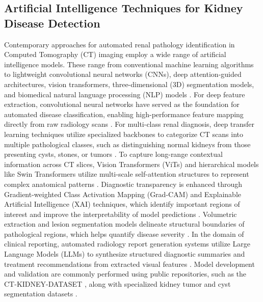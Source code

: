 \documentclass[]{elsarticle}
\begin{document}
\subsection{Artificial Intelligence Techniques for Kidney Disease Detection}
Contemporary approaches for automated renal pathology identification in Computed Tomography (CT) imaging employ a wide range of artificial intelligence models. These range from conventional machine learning algorithms to lightweight convolutional neural networks (CNNs), deep attention-guided architectures, vision transformers, three-dimensional (3D) segmentation models, and biomedical natural language processing (NLP) models \cite{aburass2025vision, liu2021swin, dosovitskiy2020image, lecun2015deep, litjens2017survey}. For deep feature extraction, convolutional neural networks have served as the foundation for automated disease classification, enabling high-performance feature mapping directly from raw radiology scans \cite{kermany2018identifying, lecun2015deep}. For multi-class renal diagnosis, deep transfer learning techniques utilize specialized backbones to categorize CT scans into multiple pathological classes, such as distinguishing normal kidneys from those presenting cysts, stones, or tumors \cite{kumar2024comprehensive, hossain2025detection}. To capture long-range contextual information across CT slices, Vision Transformers (ViTs) and hierarchical models like Swin Transformers utilize multi-scale self-attention structures to represent complex anatomical patterns \cite{aburass2025vision, liu2021swin, dosovitskiy2020image}. Diagnostic transparency is enhanced through Gradient-weighted Class Activation Mapping (Grad-CAM) and Explainable Artificial Intelligence (XAI) techniques, which identify important regions of interest and improve the interpretability of model predictions \cite{holzinger2019causability, selvaraju2017grad}. Volumetric extraction and lesion segmentation models delineate structural boundaries of pathological regions, which helps quantify disease severity \cite{aburass2025vision, hossain2025detection}. In the domain of clinical reporting, automated radiology report generation systems utilize Large Language Models (LLMs) to synthesize structured diagnostic summaries and treatment recommendations from extracted visual features \cite{liu2024bootstrapping, sloan2024automated}. Model development and validation are commonly performed using public repositories, such as the CT-KIDNEY-DATASET \cite{dataset_kaggle}, along with specialized kidney tumor and cyst segmentation datasets \cite{dataset_roboflow_tumor, dataset_roboflow_cyst}.
\end{document}

